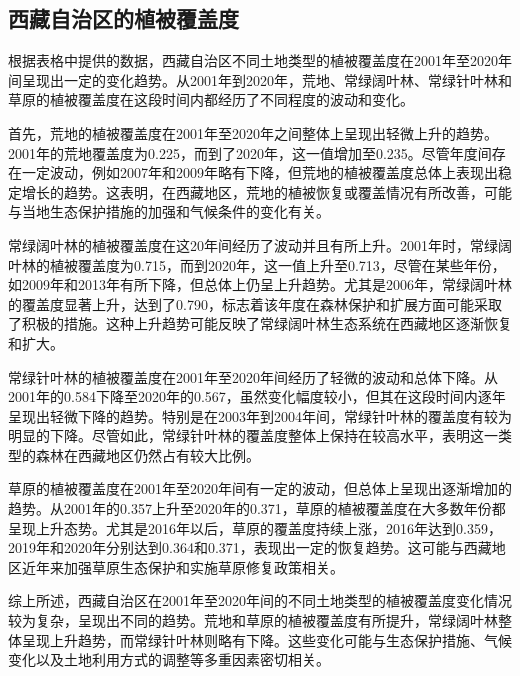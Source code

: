 \documentclass[AutoFakeBold]{LZUThesis-PgD&PhD}
\begin{document}
    \subsection{西藏自治区的植被覆盖度}
		

        \par 根据表格中提供的数据，西藏自治区不同土地类型的植被覆盖度在2001年至2020年间呈现出一定的变化趋势。从2001年到2020年，荒地、常绿阔叶林、常绿针叶林和草原的植被覆盖度在这段时间内都经历了不同程度的波动和变化。
        
        首先，荒地的植被覆盖度在2001年至2020年之间整体上呈现出轻微上升的趋势。2001年的荒地覆盖度为0.225，而到了2020年，这一值增加至0.235。尽管年度间存在一定波动，例如2007年和2009年略有下降，但荒地的植被覆盖度总体上表现出稳定增长的趋势。这表明，在西藏地区，荒地的植被恢复或覆盖情况有所改善，可能与当地生态保护措施的加强和气候条件的变化有关。
        
        常绿阔叶林的植被覆盖度在这20年间经历了波动并且有所上升。2001年时，常绿阔叶林的植被覆盖度为0.715，而到2020年，这一值上升至0.713，尽管在某些年份，如2009年和2013年有所下降，但总体上仍呈上升趋势。尤其是2006年，常绿阔叶林的覆盖度显著上升，达到了0.790，标志着该年度在森林保护和扩展方面可能采取了积极的措施。这种上升趋势可能反映了常绿阔叶林生态系统在西藏地区逐渐恢复和扩大。
        
        常绿针叶林的植被覆盖度在2001年至2020年间经历了轻微的波动和总体下降。从2001年的0.584下降至2020年的0.567，虽然变化幅度较小，但其在这段时间内逐年呈现出轻微下降的趋势。特别是在2003年到2004年间，常绿针叶林的覆盖度有较为明显的下降。尽管如此，常绿针叶林的覆盖度整体上保持在较高水平，表明这一类型的森林在西藏地区仍然占有较大比例。
        
        草原的植被覆盖度在2001年至2020年间有一定的波动，但总体上呈现出逐渐增加的趋势。从2001年的0.357上升至2020年的0.371，草原的植被覆盖度在大多数年份都呈现上升态势。尤其是2016年以后，草原的覆盖度持续上涨，2016年达到0.359，2019年和2020年分别达到0.364和0.371，表现出一定的恢复趋势。这可能与西藏地区近年来加强草原生态保护和实施草原修复政策相关。
        
        综上所述，西藏自治区在2001年至2020年间的不同土地类型的植被覆盖度变化情况较为复杂，呈现出不同的趋势。荒地和草原的植被覆盖度有所提升，常绿阔叶林整体呈现上升趋势，而常绿针叶林则略有下降。这些变化可能与生态保护措施、气候变化以及土地利用方式的调整等多重因素密切相关。
        
\end{document}

